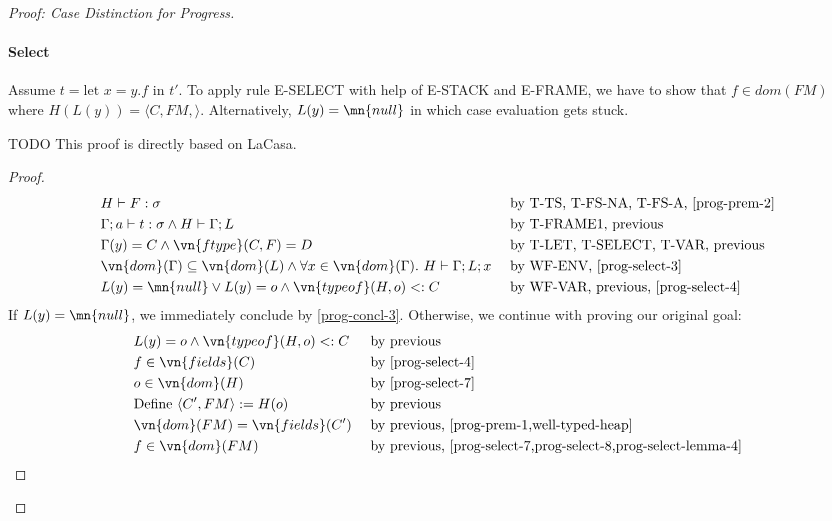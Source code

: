 \begin{proof}[Proof: Case Distinction for Progress]
\paragraph{Select}
Assume $t = \text{let } x = y.f \text{ in } t'$. To apply rule E-SELECT with help of E-STACK and E-FRAME, we have to show that $f \in dom(FM)$ where $H(L(y)) = \langle C, FM, \rangle$. Alternatively, $L(y) = \mn{null}$ in which case evaluation gets stuck.

TODO This proof is directly based on LaCasa.

\begin{proof}
\begin{alignat}{3}
    &H \vdash F : \sigma
        && \text{ by T-TS, T-FS-NA, T-FS-A, \cref{prog-prem-2}}\\
    &\Gamma; a \vdash t : \sigma
    \wedge H \vdash \Gamma; L \label{prog-select-3}
        && \text{ by T-FRAME1, previous}\\
    &\Gamma(y) = C
    \wedge \vn{ftype}(C, F) = D \label{prog-select-4}
        && \text{ by T-LET, T-SELECT, T-VAR, previous}\\
    &\vn{dom}(\Gamma) \subseteq \vn{dom}(L)
    \wedge \forall x \in \vn{dom}(\Gamma).\ H \vdash \Gamma; L; x
        && \text{ by WF-ENV, \cref{prog-select-3}}\\
    &L(y) = \mn{null} \vee L(y) = o \wedge \vn{typeof}(H, o) <: C
        && \text{ by WF-VAR, previous, \cref{prog-select-4}}
\end{alignat}
If $L(y) = \mn{null}$, we immediately conclude by \cref{prog-concl-3}. Otherwise, we continue with proving our original goal:
\begin{alignat}{3}
    &L(y) = o \wedge \vn{typeof}(H, o) <: C \label{prog-select-7}
        && \text{ by previous}\\
    &f \in \vn{fields}(C) \label{prog-select-8}
        && \text{ by \cref{prog-select-4}}\\
    &o \in \vn{dom}(H) 
        && \text{ by \cref{prog-select-7}}\\
    &\text{Define } \langle C', FM \rangle := H(o)
        && \text{ by previous}\\
    &\vn{dom}(FM) = \vn{fields}(C')
        && \text{ by previous, \cref{prog-prem-1,well-typed-heap}}\\
    &f \in \vn{dom}(FM)
        && \text{ by previous, \cref{prog-select-7,prog-select-8,prog-select-lemma-4}}
\end{alignat}
\end{proof}


\end{proof}
